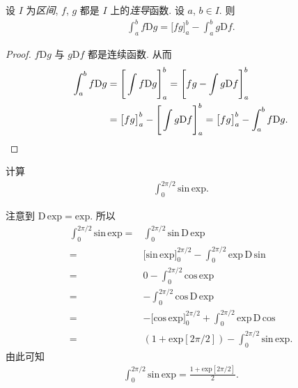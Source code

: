 \begin{theorem}
    设 $I$ 为\emph{区间}, $f$, $g$ 都是 $I$ 上的\emph{连导}函数. 设 $a$, $b \in I$. 则
    \begin{align*}
        \int_{a}^{b} {f\mathrm{D}g} = \big[ fg \big]_{a}^{b} - \int_{a}^{b} {g\mathrm{D}f}.
    \end{align*}
\end{theorem}

\begin{proof}
    $f\mathrm{D}g$ 与 $g\mathrm{D}f$ 都是连续函数. 从而
    \begin{align*}
        \int_{a}^{b} {f\mathrm{D}g}
        = {} & \Bigg[ \int {f\mathrm{D}g} \Bigg]_{a}^{b}
        = \Bigg[ fg - \int {g\mathrm{D}f} \Bigg]_{a}^{b}                          \\
        = {} & \big[ fg \big]_{a}^{b} - \Bigg[ \int {g\mathrm{D}f} \Bigg]_{a}^{b}
        = \big[ fg \big]_{a}^{b} - \int_{a}^{b} {f\mathrm{D}g}. \qedhere
    \end{align*}
\end{proof}

\begin{example}
    计算
    \begin{align*}
        \int_{0}^{2\pi/2} {\mathrm{sin}\, \mathrm{exp}}.
    \end{align*}

    注意到 $\mathrm{D}\,\mathrm{exp} = \mathrm{exp}$. 所以
    \begin{align*}
        \int_{0}^{2\pi/2} {\mathrm{sin}\, \mathrm{exp}}
        = {} & \int_{0}^{2\pi/2} {\mathrm{sin}\, \mathrm{D}\,\mathrm{exp}}     \\
        = {} & \big[ \mathrm{sin}\,\mathrm{exp} \big]_{0}^{2\pi/2}
        - \int_{0}^{2\pi/2} {\mathrm{exp}\, \mathrm{D}\,\mathrm{sin}}          \\
        = {} & 0 - \int_{0}^{2\pi/2} {\mathrm{cos}\, \mathrm{exp}}             \\
        = {} & {-\int_{0}^{2\pi/2} {\mathrm{cos}\, \mathrm{D}\, \mathrm{exp}}} \\
        = {} & {-\big[ \mathrm{cos}\,\mathrm{exp} \big]}_{0}^{2\pi/2}
        + \int_{0}^{2\pi/2} {\mathrm{exp}\, \mathrm{D}\,\mathrm{cos}}          \\
        = {} & (1 + \mathrm{exp} [2\pi/2])
        - \int_{0}^{2\pi/2} {\mathrm{sin}\, \mathrm{exp}}.
    \end{align*}
    由此可知
    \begin{align*}
        \int_{0}^{2\pi/2} {\mathrm{sin}\, \mathrm{exp}} = \frac{1 + \mathrm{exp} [2\pi/2]}{2}.
    \end{align*}
\end{example}

